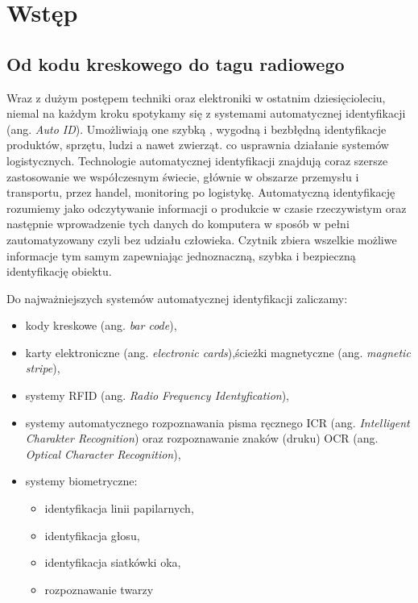 \chapter{Wstęp}

\section{Od kodu kreskowego do tagu radiowego}

Wraz z dużym postępem techniki oraz elektroniki w ostatnim dziesięcioleciu, niemal na każdym kroku spotykamy się z systemami automatycznej identyfikacji (ang. \emph{Auto ID}).  Umożliwiają one szybką , wygodną i bezbłędną identyfikacje produktów, sprzętu, ludzi a nawet zwierząt.  co usprawnia działanie systemów logistycznych. Technologie automatycznej identyfikacji znajdują coraz szersze zastosowanie we współczesnym świecie, głównie w obszarze przemysłu i transportu, przez handel, monitoring  po logistykę. Automatyczną identyfikację rozumiemy jako odczytywanie informacji o produkcie  w czasie rzeczywistym oraz następnie wprowadzenie tych danych do komputera w sposób w pełni zautomatyzowany czyli bez udziału człowieka.  Czytnik zbiera wszelkie możliwe informacje tym samym  zapewniając jednoznaczną, szybka i bezpieczną identyfikację obiektu.

Do najważniejszych systemów automatycznej identyfikacji zaliczamy:
\begin{itemize}\setlength{\itemsep}{0pt}
    \item kody kreskowe (ang. \emph{bar code}),
    \item karty elektroniczne  (ang. \emph{electronic cards}),ścieżki magnetyczne (ang. \emph{magnetic stripe}),
    \item systemy RFID (ang. \emph{Radio Frequency Identyfication}),
    \item systemy automatycznego rozpoznawania pisma ręcznego ICR (ang. \emph{Intelligent Charakter Recognition}) oraz rozpoznawanie znaków (druku)  OCR (ang. \emph{Optical Character Recognition}),
    \item systemy biometryczne:
	\begin{itemize}\setlength{\itemsep}{0pt}
		\item identyfikacja linii papilarnych,
		\item identyfikacja głosu,
		\item identyfikacja siatkówki oka,
		\item rozpoznawanie twarzy
	\end{itemize}
\end{itemize}

